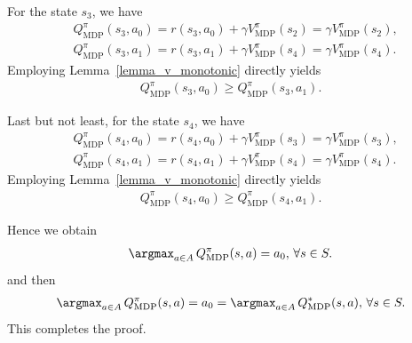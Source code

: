 \begin{myproof}
For the state $s_3$, we have
\begin{align}
    &Q_\text{MDP}^{\pi}(s_3, a_0) = r(s_3, a_0) + \gamma V_\text{MDP}^{\pi}(s_2) = \gamma V_\text{MDP}^{\pi}(s_2), \\
    &Q_\text{MDP}^{\pi}(s_3, a_1) = r(s_3, a_1) + \gamma V_\text{MDP}^{\pi}(s_4) = \gamma V_\text{MDP}^{\pi}(s_4).
\end{align}
%
Employing Lemma~\ref{lemma_v_monotonic} directly yields
\begin{align}
    Q_\text{MDP}^{\pi}(s_3, a_0) \geq Q_\text{MDP}^{\pi}(s_3, a_1).
\end{align}
%

Last but not least, for the state $s_4$, we have
\begin{align}
    &Q_\text{MDP}^{\pi}(s_4, a_0) = r(s_4, a_0) + \gamma V_\text{MDP}^{\pi}(s_3) = \gamma V_\text{MDP}^{\pi}(s_3), \\
    &Q_\text{MDP}^{\pi}(s_4, a_1) = r(s_4, a_1) + \gamma V_\text{MDP}^{\pi}(s_4) = \gamma V_\text{MDP}^{\pi}(s_4).
\end{align}
%
Employing Lemma~\ref{lemma_v_monotonic} directly yields
\begin{align}
    Q_\text{MDP}^{\pi}(s_4, a_0) \geq Q_\text{MDP}^{\pi}(s_4, a_1).
\end{align}
%

Hence we obtain
\begin{align}
   \argmax_{ a \in A} \, Q_\text{MDP}^{\pi}(s, a)  = a_0, \, \forall s \in S.
\end{align}
and then
\begin{align}
    \argmax_{ a \in A} \, Q_\text{MDP}^{\pi}(s, a) = a_0 =  \argmax_{ a \in A} \, Q_\text{MDP}^*(s, a), \, \forall s \in S.
\end{align}
This completes the proof.





\end{myproof}
